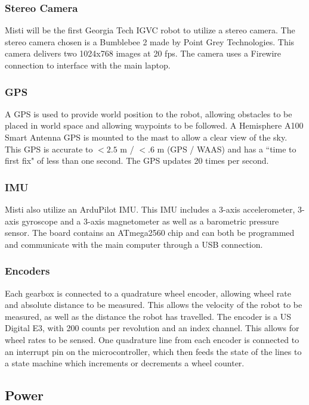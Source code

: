 \subsubsection{Stereo Camera}

Misti will be the first Georgia Tech IGVC robot to utilize a stereo camera. The stereo camera chosen is a Bumblebee 2 made by Point Grey Technologies. This camera delivers two 1024x768 images at 20 fps. The camera uses a Firewire connection to interface with the main laptop. 

\subsubsection{GPS}

A GPS is used to provide world position to the robot, allowing obstacles to be placed in world space and allowing waypoints to be followed. A Hemisphere A100 Smart Antenna GPS is mounted to the mast to allow a clear view of the sky. This GPS is accurate to $<2.5$ m / $<.6$ m (GPS / WAAS) and has a ``time to first fix" of less than one second. The GPS updates 20 times per second.

\subsubsection{IMU}

Misti also utilize an ArduPilot IMU. This IMU includes a 3-axis accelerometer, 3-axis gyroscope and a 3-axis magnetometer as well as a barometric pressure sensor. The board contains an ATmega2560 chip and can both be programmed and communicate with the main computer through a USB connection.
 
\subsubsection{Encoders}

Each gearbox is connected to a quadrature wheel encoder, allowing wheel rate and absolute distance to be measured. This allows the velocity of the robot to be measured, as well as the distance the robot has travelled. The encoder is a US Digital E3, with 200 counts per revolution and an index channel. This allows for wheel rates to be sensed. One quadrature line from each encoder is connected to an interrupt pin on the microcontroller, which then feeds the state of the lines to a state machine which increments or decrements a wheel counter.

\subsection {Power}


